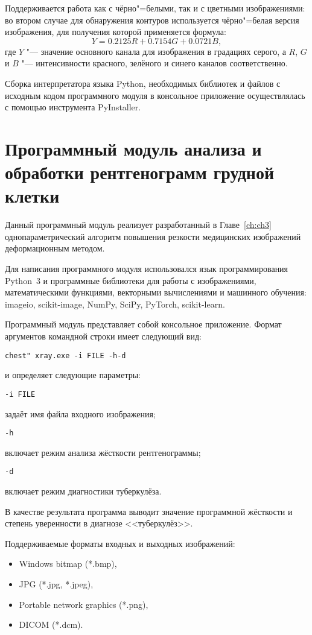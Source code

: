 Поддерживается работа как с чёрно"=белыми, так и с цветными изображениями: во втором случае для обнаружения контуров используется чёрно"=белая версия изображения, для получения которой применяется формула:
$$Y = 0.2125 R + 0.7154 G + 0.0721 B,$$
где $Y$ "--- значение основного канала для изображения в градациях серого, а $R$, $G$ и $B$ "--- интенсивности красного, зелёного и синего каналов соответственно.

Сборка интерпретатора языка Python, необходимых библиотек и файлов с исходным кодом программного модуля в консольное приложение осуществлялась с помощью инструмента PyInstaller.

\section{Программный модуль анализа и обработки рентгенограмм грудной клетки}

Данный программный модуль реализует разработанный в Главе~\ref{ch:ch3} однопараметрический алгоритм повышения резкости медицинских изображений деформационным методом.

Для написания программного модуля использовался язык программирования Python~3 и программные библиотеки для работы с изображениями, математическими функциями, векторными вычислениями и машинного обучения: imageio, scikit-image, NumPy, SciPy, PyTorch, scikit-learn.

Программный модуль представляет собой консольное приложение. Формат аргументов командной строки имеет следующий вид:

\texttt{chest"~xray.exe -i~FILE -h\textbar -d}

\noindent и определяет следующие параметры:

\noindent \texttt{-i FILE}

задаёт имя файла входного изображения;

\noindent \texttt{-h}

включает режим анализа жёсткости рентгенограммы;

\noindent \texttt{-d}

включает режим диагностики туберкулёза.

В качестве результата программа выводит значение программной жёсткости и степень уверенности в диагнозе <<туберкулёз>>.

Поддерживаемые форматы входных и выходных изображений:

\begin{itemize}[beginpenalty=10000]
	\item Windows bitmap (*.bmp),
	\item JPG (*.jpg, *.jpeg),
	\item Portable network graphics (*.png),
	\item DICOM (*.dcm).
\end{itemize}

